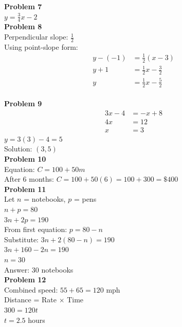 \documentclass[12pt]{article}
\begin{document}
        \textbf{Problem 7}\\
        $y = \displaystyle\frac{3}{4}x - 2$\\

        \textbf{Problem 8}\\
        Perpendicular slope: $\displaystyle\frac{1}{2}$\\
        Using point-slope form:
        \begin{align*}
        y - (-1) &= \frac{1}{2}(x - 3)\\
        y + 1 &= \frac{1}{2}x - \frac{3}{2}\\
        y &= \frac{1}{2}x - \frac{5}{2}
        \end{align*}\\

        \textbf{Problem 9}\\
        \begin{align*}
        3x - 4 &= -x + 8\\
        4x &= 12\\
        x &= 3
        \end{align*}
        $y = 3(3) - 4 = 5$\\
        Solution: $(3, 5)$\\

        \textbf{Problem 10}\\
        Equation: $C = 100 + 50m$\\
        After 6 months: $C = 100 + 50(6) = 100 + 300 = \$400$\\

        \textbf{Problem 11}\\
        Let $n$ = notebooks, $p$ = pens\\
        $n + p = 80$\\
        $3n + 2p = 190$\\
        From first equation: $p = 80 - n$\\
        Substitute: $3n + 2(80 - n) = 190$\\
        $3n + 160 - 2n = 190$\\
        $n = 30$\\
        Answer: 30 notebooks\\

        \textbf{Problem 12}\\
        Combined speed: $55 + 65 = 120$ mph\\
        Distance = Rate $\times$ Time\\
        $300 = 120t$\\
        $t = 2.5$ hours
\end{document}
